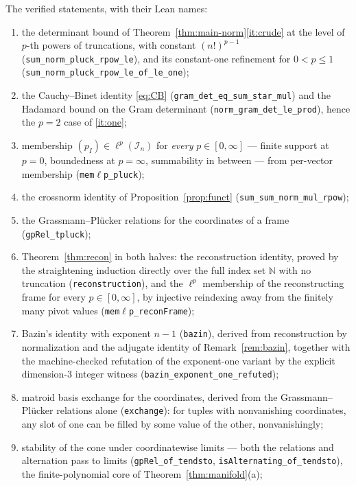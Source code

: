 \documentclass[11pt]{amsart}
\theoremstyle{definition}
\newcommand{\N}{\mathbb{N}}
\begin{document}
The verified statements, with their Lean names:
\begin{enumerate}[label=\textup{(\roman*)}]
\item the determinant bound of Theorem~\ref{thm:main-norm}\ref{it:crude} at the level of $p$-th powers of truncations, with constant $(n!)^{p-1}$ (\texttt{sum\_norm\_pluck\_rpow\_le}), and its constant-one refinement for $0<p\le1$ (\texttt{sum\_norm\_pluck\_rpow\_le\_of\_le\_one});
\item the Cauchy--Binet identity \eqref{eq:CB} (\texttt{gram\_det\_eq\_sum\_star\_mul}) and the Hadamard bound on the Gram determinant (\texttt{norm\_gram\_det\_le\_prod}), hence the $p=2$ case of \ref{it:one};
\item membership $(p_I)\in\ell^p(\mathcal I_n)$ for \emph{every} $p\in[0,\infty]$ --- finite support at $p=0$, boundedness at $p=\infty$, summability in between --- from per-vector membership (\texttt{mem\ensuremath{\ell}p\_pluck});
\item the crossnorm identity of Proposition~\ref{prop:funct} (\texttt{sum\_sum\_norm\_mul\_rpow});
\item the Grassmann--Pl\"ucker relations for the coordinates of a frame (\texttt{gpRel\_tpluck});
\item Theorem~\ref{thm:recon} in both halves: the reconstruction identity, proved by the straightening induction directly over the full index set $\N$ with no truncation (\texttt{reconstruction}), and the $\ell^p$ membership of the reconstructing frame for every $p\in[0,\infty]$, by injective reindexing away from the finitely many pivot values (\texttt{mem\ensuremath{\ell}p\_reconFrame});
\item Bazin's identity with exponent $n-1$ (\texttt{bazin}), derived from reconstruction by normalization and the adjugate identity of Remark~\ref{rem:bazin}, together with the machine-checked refutation of the exponent-one variant by the explicit dimension-$3$ integer witness (\texttt{bazin\_exponent\_one\_refuted});
\item matroid basis exchange for the coordinates, derived from the Grassmann--Pl\"ucker relations alone (\texttt{exchange}): for tuples with nonvanishing coordinates, any slot of one can be filled by some value of the other, nonvanishingly;
\item stability of the cone under coordinatewise limits --- both the relations and alternation pass to limits (\texttt{gpRel\_of\_tendsto}, \texttt{isAlternating\_of\_tendsto}), the finite-polynomial core of Theorem~\ref{thm:manifold}(a);

\end{enumerate}
\end{document}
